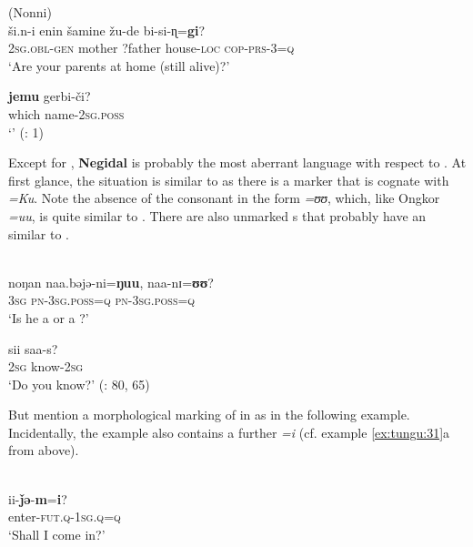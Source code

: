 \ea%
    \label{ex:tungu:30}
     (Nonni)\\
    \ea
    \gll ši.n-i    enin  šamine    žu-de    bi-si-ɳ=\textbf{{gi}}?\\
    2\textsc{sg}.\textsc{obl}-\textsc{gen}  mother  ?father    house-\textsc{loc}  \textsc{cop}-\textsc{prs}-3=\textsc{q}\\
    \glt ‘Are your parents at home (still alive)?’
    
    \ex
    \gll \textbf{{jemu}} gerbi-či?\\
    which  name-2\textsc{sg}.\textsc{poss}\\
    \glt ‘’ (\citealt{Ivanovskij1982}: 1)
    \z
    \z

Except for , \textbf{Negidal} is probably the most aberrant  language with respect to . At first glance, the situation is similar to  as there is a marker that is cognate with \textit{=Ku}. Note the absence of the consonant in the form \textit{=ʊʊ}, which, like Ongkor  \textit{=uu}, is quite similar to . There are also unmarked s that probably have an  similar to .

\ea%
    \label{ex:tungu:31}
    \\
    \ea
    \gll noŋan    naa.bəjə-ni=\textbf{{ŋuu}},  naa-nɪ=\textbf{{ʊʊ}}?\\
    3\textsc{sg}    \textsc{pn}-3\textsc{sg.poss}=\textsc{q}  \textsc{pn}-3\textsc{sg.poss}=\textsc{q}\\
    \glt ‘Is he a  or a ?’
    
    \ex
    \gll sii  saa-s?\\
    2\textsc{sg}  know-2\textsc{sg}\\
    \glt ‘Do you know?’ (\citealt{Kazama2002a}: 80, 65)
    \z
    \z

But \citet[10]{KhasanovaPevnov2003} mention a morphological marking of  in  as in the following example. Incidentally, the example also contains a further  \textit{=i} (cf. example \ref{ex:tungu:31}a from  above).

\ea%
    \label{ex:tungu:32}
    \\
    \gll ii-\textbf{{ǰə}}{-}\textbf{{m}}{=}\textbf{{i}}?\\
    enter-\textsc{fut}.\textsc{q}-1\textsc{sg}.\textsc{q}=\textsc{q}\\
    \glt ‘Shall I come in?’ \citep[127]{Kazama2002a}
    \z


